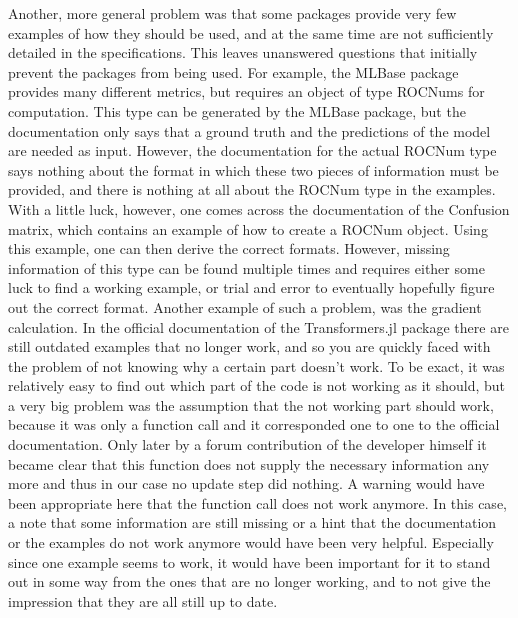 Another, more general problem was that some packages provide very few examples of how they should be used, and at the same time are not sufficiently detailed in the specifications. This leaves unanswered questions that initially prevent the packages from being used. For example, the MLBase package provides many different metrics, but requires an object of type ROCNums for computation. This type can be generated by the MLBase package, but the documentation only says that a ground truth and the predictions of the model are needed as input. However, the documentation for the actual ROCNum type says nothing about the format in which these two pieces of information must be provided, and there is nothing at all about the ROCNum type in the examples. With a little luck, however, one comes across the documentation of the Confusion matrix, which contains an example of how to create a ROCNum object. Using this example, one can then derive the correct formats. However, missing information of this type can be found multiple times and requires either some luck to find a working example, or trial and error to eventually hopefully figure out the correct format.  Another example of such a problem, was the gradient calculation. In the official documentation of the Transformers.jl package there are still outdated examples that no longer work, and so you are quickly faced with the problem of not knowing why a certain part doesn't work. To be exact, it was relatively easy to find out which part of the code is not working as it should, but a very big problem was the assumption that the not working part should work, because it was only a function call and it corresponded one to one to the official documentation. Only later by a forum contribution of the developer himself it became clear that this function does not supply the necessary information any more and thus in our case no update step did nothing. A warning would have been appropriate here that the function call does not work anymore. In this case, a note that some information are still missing or a hint that the documentation or the examples do not work anymore would have been very helpful. Especially since one example seems to work, it would have been important for it to stand out in some way from the ones that are no longer working, and to not give the impression that they are all still up to date.
